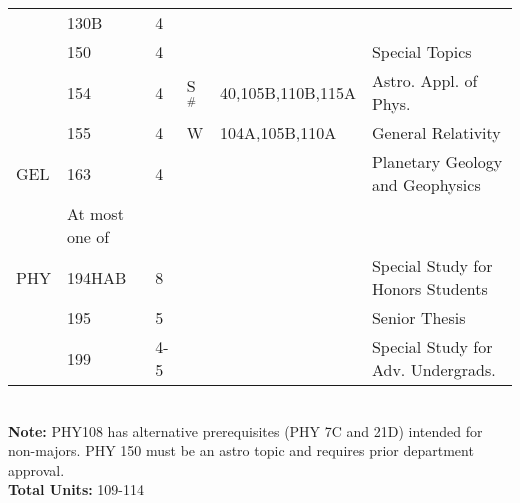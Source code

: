\documentclass[12pt]{article}
\begin{document}
\begin{tabular}{|llllll|}
    & 130B & 4 &  &  & \\  
    & 150  & 4 &  &  & Special Topics\\  
    & 154  & 4 & S$^\#$ & 40,105B,110B,115A & Astro. Appl. of Phys. \\
    & 155  & 4 & W   & 104A,105B,110A & General Relativity \\ 
GEL & 163  & 4 &  &  & Planetary Geology and Geophysics\\ 
 & At most one of &  &  &  & \\ 
PHY & 194HAB & 8 &  &  & Special Study for Honors Students\\ 
    & 195  & 5 &  &  & Senior Thesis\\ 
    & 199  & 4-5 &  &  & Special Study for Adv. Undergrads.\\ 
\hline
\end{tabular}\\
\vskip 0.25cm
\noindent
{\bf Note:} PHY108 has alternative prerequisites (PHY 7C and 21D)
intended for non-majors.  PHY 150 must be an astro topic and requires
prior department approval.\\
\noindent
{\bf Total Units:} 109-114 \\
\end{document}
